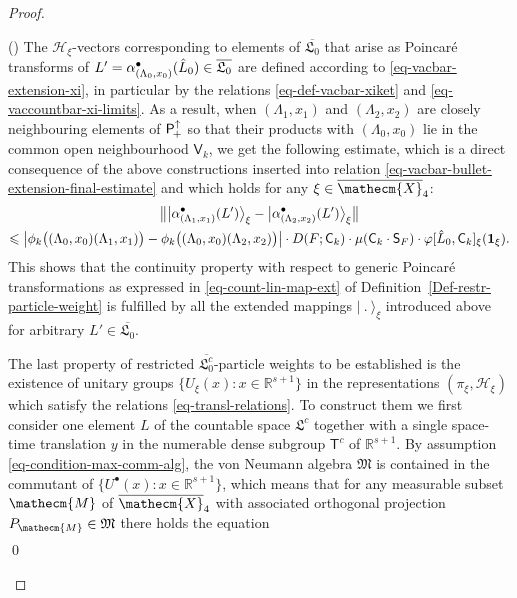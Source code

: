 \documentclass[11pt,twoside,openright]{report}
\theoremstyle{definition}
\theoremstyle{plain}
\theoremstyle{remark}
\theoremstyle{assumption}
\newcommand{\bset}[1]{\bigl\{ #1 \bigr\}}
\newcommand{\babs}[1]{\bigl\lvert #1 \bigr\rvert}
\newcommand{\bnorm}[1]{\bigl\lVert #1 \bigr\rVert}
\newcommand{\xiket}[1]{\vert #1 \rangle_\xi}
\newcommand{\bxiket}[1]{\big\vert #1 \bigr\rangle_\xi}
\newcommand{\Mecm}{\mathecm{M}}
\newcommand{\Mfrak}{\mathfrak{M}}
\newcommand{\Hscr}{\mathscr{H}}
\newcommand{\Csf}{\mathsf{C}}
\newcommand{\Ssf}{\mathsf{S}}
\newcommand{\Vsf}{\mathsf{V}}
\newcommand{\unit}{\mathbf{1}}
\newcommand{\Rsone}{\mathbb{R}^{s + 1}}
\newcommand{\Xecmbar}{\overline{\mathecm{X}}}
\newcommand{\Poin}{\mathsf{P}_{\negthinspace +}^\uparrow}
\newcommand{\abulletLaxzero}{\alpha^\bullet_{( \Lambda_0 , x_0 )}}
\newcommand{\abulletLaxone}{\alpha^\bullet_{( \Lambda_1 , x_1 )}}
\newcommand{\abulletLaxtwo}{\alpha^\bullet_{( \Lambda_2 , x_2 )}}
\newcommand{\Tcount}{\mathsf{T}^c}
\newcommand{\idealcount}{\mathfrak{L}^c}
\newcommand{\vacbar}{\overline{\mathfrak{L}_0}}
\newcommand{\vaccountbar}{\overline{\mathfrak{L}_0^c}}
\newcounter{proofitem}
\newenvironment{prooflist}{\begin{list}{(\roman{proofitem})}%
  {\usecounter{proofitem} \setlength{\topsep}{0ex}%
   \setlength{\parsep}{0.2ex} \setlength{\itemsep}{0.4ex}%
   \setlength{\leftmargin}{0em} \setlength{\itemindent}{0.5em}%
   \setlength{\listparindent}{1em}}}{\qed \end{list}}
\begin{document}
\begin{proof}
\begin{prooflist}
    The $\Hscr_\xi$-vectors corresponding to elements of $\vacbar$
    that arise as Poincar\'{e} transforms of $L' = \abulletLaxzero (
    \Hat{L}_0) \in \vacbar$ are defined according to
    \eqref{eq-vacbar-extension-xi}, in particular by the relations
    \eqref{eq-def-vacbar-xiket} and \eqref{eq-vaccountbar-xi-limits}.
    As a result, when $( \Lambda_1 , x_1 )$ and $( \Lambda_2 , x_2 )$
    are closely neighbouring elements of $\Poin$ so that their
    products with $( \Lambda_0 , x_0 )$ lie in the common open
    neighbourhood $\Vsf_k$, we get the following estimate, which is a
    direct consequence of the above constructions inserted into
    relation \eqref{eq-vacbar-bullet-extension-final-estimate} and
    which holds for any $\xi \in \Xecmbar_4$:
    \begin{multline}
      \label{eq-vacbar-bullet-continuity}
      \bnorm{\bxiket{\abulletLaxone ( L' )} - \bxiket{\abulletLaxtwo (
      L' )}} \\ 
      \leqslant \babs{\phi_k \bigl( ( \Lambda_0 , x_0 ) ( \Lambda_1 ,
      x_1 ) \bigr) - \phi_k \bigl( ( \Lambda_0 , x_0 ) ( \Lambda_2 ,
      x_2 ) \bigr)} \cdot D ( F ; \Csf_k ) \cdot \mu ( \Csf_k \cdot
      \Ssf_F ) \cdot \varphi [ \Hat{L}_0 , \Csf_k ]_\xi ( \unit_\xi )
      \text{.}
    \end{multline}
    This shows that the continuity property with respect to generic
    Poincar\'{e} transformations as expressed in
    \eqref{eq-count-lin-map-ext} of
    Definition~\ref{Def-restr-particle-weight} is fulfilled by all the
    extended mappings $\xiket{~.~}$ introduced above for arbitrary $L'
    \in \vacbar$.
  \item The last property of restricted $\vaccountbar$-particle
    weights to be established is the existence of unitary groups
    $\bset{U_\xi ( x ) : x \in \Rsone}$ in the representations $(
    \pi_\xi , \Hscr_\xi)$ which satisfy the relations
    \eqref{eq-transl-relations}. To construct them we first consider
    one element $L$ of the countable space $\idealcount$ together with
    a single space-time translation $y$ in the numerable dense
    subgroup $\Tcount$ of $\Rsone$. By assumption
    \eqref{eq-condition-max-comm-alg}, the von Neumann algebra
    $\Mfrak$ is contained in the commutant of $\bset{U^\bullet ( x ) :
    x \in \Rsone}$, which means that for any measurable subset $\Mecm$
    of $\Xecmbar_4$ with associated orthogonal projection $P_\Mecm \in
    \Mfrak$ there holds the equation
    \begin{subequations}
      \begin{multline}

\end{multline}
\end{subequations}
\end{prooflist}
\end{proof}
\end{document}
